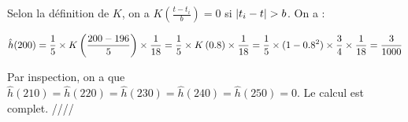 \documentclass[../main.tex]{subfiles}
\begin{document}
\begin{CJK*}{UTF8}{gbsn}
Selon la définition de $K$, on a $K(\frac{t-t_{i}}{b}) = 0$ si $\abs{t_i-t} > b$. 
On a :

\begin{equation*}
    \hat{h}(200) = \frac{1}{5} \times K\left ( \frac{200-196}{5} \right ) \times \frac{1}{18}
                 = \frac{1}{5} \times K\left ( 0.8 \right ) \times \frac{1}{18}
                 = \frac{1}{5} \times (1-0.8^2) \times \frac{3}{4} \times \frac{1}{18}
                 = \frac{3}{1000}
\end{equation*}

Par inspection,
on a que $\hat{h}(210) = \hat{h}(220) = \hat{h}(230) = \hat{h}(240) =  \hat{h}(250) = 0$. 
Le calcul est complet. ////

\end{CJK*}
\end{document}

